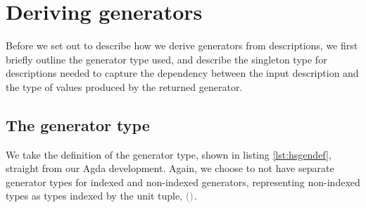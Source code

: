 \documentclass[a4paper,msc,twosized=semi]{uustthesis}
\newcommand*{\mathcolor}{}
\def\mathcolor#1#{\mathcoloraux{#1}}
\newcommand*{\mathcoloraux}[3]{%
  \protect\leavevmode
  \begingroup
    \color#1{#2}#3%
  \endgroup
}
\newcommand{\HSSpecial}[1]{\mathcolor{hsblue4}{#1}}
\begin{document}
\section{Deriving generators}

  Before we set out to describe how we derive generators from descriptions, we first 
  briefly outline the generator type used, and describe the singleton type for 
  descriptions needed to capture the dependency between the input description and the 
  type of values produced by the returned generator. 

\subsection{The generator type}

  We take the definition of the generator type, shown in listing \ref{lst:hsgendef}, 
  straight from our Agda development. Again, we choose to not have separate generator 
  types for indexed and non-indexed generators, representing non-indexed types as 
  types indexed by the unit tuple, \ensuremath{\HSSpecial{(}\HSSpecial{)}}. 
\end{document}
